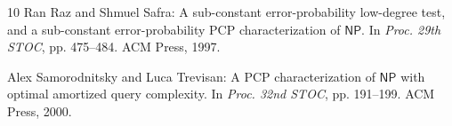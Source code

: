 \begin{thebibliography}{10}
{\sc Ran Raz and Shmuel Safra}: A sub-constant error-probability low-degree
  test, and a sub-constant error-probability {PCP} characterization of
  $\mathsf{NP}$.
\newblock In {\em Proc. 29th STOC}, pp. 475--484. ACM Press, 1997.
\newblock [\epfmtdoi{10.1145/258533.258641}]

{\sc Alex Samorodnitsky and Luca Trevisan}: A {PCP} characterization of
  $\mathsf{NP}$ with optimal amortized query complexity.
\newblock In {\em Proc. 32nd STOC}, pp. 191--199. ACM Press, 2000.
\newblock [\epfmtdoi{10.1145/335305.335329}]

\end{thebibliography}

